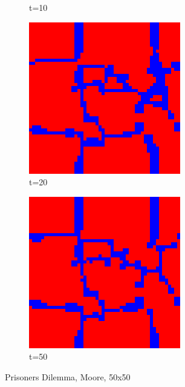 \documentclass[a4paper, 11pt]{article}
\begin{document}
\begin{figure}[H]
\begin{subfigure}{.33\textwidth}
  \caption{t=10}
\end{subfigure}%
\begin{subfigure}{.33\textwidth}
  \centering
  \includegraphics[width=0.9\linewidth]{PRISONERS_DILEMMA_MOORE_50x50_t20}
  \caption{t=20}
\end{subfigure}%
\begin{subfigure}{.33\textwidth}
  \centering
  \includegraphics[width=0.9\linewidth]{PRISONERS_DILEMMA_MOORE_50x50_t50}
  \caption{t=50}
\end{subfigure}
\caption{Prisoners Dilemma, Moore, 50x50}
\end{figure}
\end{document}
